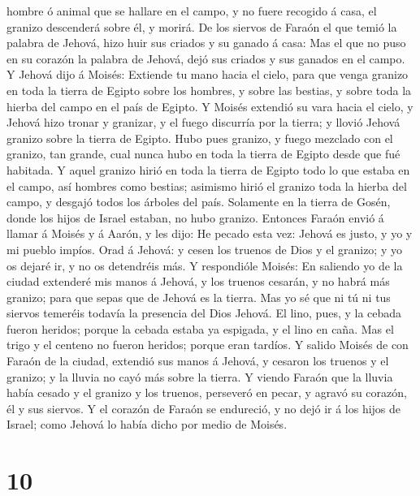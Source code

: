 hombre ó animal que se hallare en el campo, y no fuere recogido á casa,
el granizo descenderá sobre él, y morirá.  De los siervos
de Faraón el que temió la palabra de Jehová, hizo huir sus criados y su
ganado á casa:  Mas el que no puso en su corazón la
palabra de Jehová, dejó sus criados y sus ganados en el campo.
 Y Jehová dijo á Moisés: Extiende tu mano hacia el cielo,
para que venga granizo en toda la tierra de Egipto sobre los hombres, y
sobre las bestias, y sobre toda la hierba del campo en el país de
Egipto.  Y Moisés extendió su vara hacia el cielo, y
Jehová hizo tronar y granizar, y el fuego discurría por la tierra; y
llovió Jehová granizo sobre la tierra de Egipto.  Hubo
pues granizo, y fuego mezclado con el granizo, tan grande, cual nunca
hubo en toda la tierra de Egipto desde que fué habitada. 
Y aquel granizo hirió en toda la tierra de Egipto todo lo que estaba en
el campo, así hombres como bestias; asimismo hirió el granizo toda la
hierba del campo, y desgajó todos los árboles del país. 
Solamente en la tierra de Gosén, donde los hijos de Israel estaban, no
hubo granizo.  Entonces Faraón envió á llamar á Moisés y
á Aarón, y les dijo: He pecado esta vez: Jehová es justo, y yo y mi
pueblo impíos.  Orad á Jehová: y cesen los truenos de
Dios y el granizo; y yo os dejaré ir, y no os detendréis más.
 Y respondióle Moisés: En saliendo yo de la ciudad
extenderé mis manos á Jehová, y los truenos cesarán, y no habrá más
granizo; para que sepas que de Jehová es la tierra.  Mas
yo sé que ni tú ni tus siervos temeréis todavía la presencia del Dios
Jehová.  El lino, pues, y la cebada fueron heridos;
porque la cebada estaba ya espigada, y el lino en caña. 
Mas el trigo y el centeno no fueron heridos; porque eran tardíos.
 Y salido Moisés de con Faraón de la ciudad, extendió sus
manos á Jehová, y cesaron los truenos y el granizo; y la lluvia no cayó
más sobre la tierra.  Y viendo Faraón que la lluvia había
cesado y el granizo y los truenos, perseveró en pecar, y agravó su
corazón, él y sus siervos.  Y el corazón de Faraón se
endureció, y no dejó ir á los hijos de Israel; como Jehová lo había
dicho por medio de Moisés.

\hypertarget{section-9}{%
\section{10}\label{section-9}}


